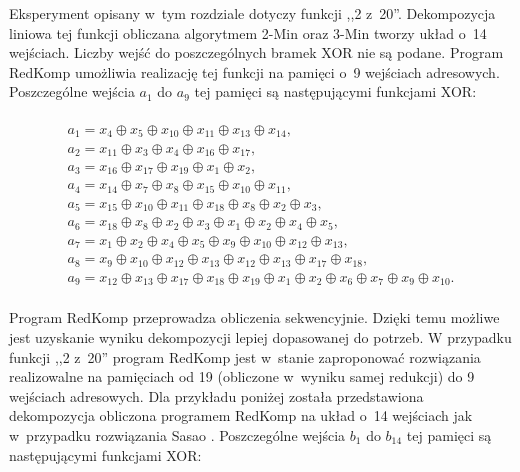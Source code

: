 Eksperyment opisany w~tym rozdziale dotyczy funkcji ,,2 z~20''.
Dekompozycja liniowa tej funkcji obliczana algorytmem 2-Min oraz 3-Min \cite{sasao-s-min} tworzy układ o~14 wejściach.
Liczby wejść do poszczególnych bramek XOR nie są podane.
Program RedKomp umożliwia realizację tej funkcji na pamięci o~9 wejściach adresowych.
Poszczególne wejścia $a_1$ do $a_9$ tej pamięci są następującymi funkcjami XOR:

\begin{multline} \\
a_1 = x_{4} \oplus x_{5} \oplus x_{10} \oplus x_{11} \oplus x_{13} \oplus x_{14}, \\
a_2 = x_{11} \oplus x_{3} \oplus x_{4} \oplus x_{16} \oplus x_{17}, \\
a_3 = x_{16} \oplus x_{17} \oplus x_{19} \oplus x_{1} \oplus x_{2}, \\
a_4 = x_{14} \oplus x_{7} \oplus x_{8} \oplus x_{15} \oplus x_{10} \oplus x_{11}, \\
a_5 = x_{15} \oplus x_{10} \oplus x_{11} \oplus x_{18} \oplus x_{8} \oplus x_{2} \oplus x_{3}, \\
a_6 = x_{18} \oplus x_{8} \oplus x_{2} \oplus x_{3} \oplus x_{1} \oplus x_{2} \oplus x_{4} \oplus x_{5}, \\
a_7 = x_{1} \oplus x_{2} \oplus x_{4} \oplus x_{5} \oplus x_{9} \oplus x_{10} \oplus x_{12} \oplus x_{13}, \\
a_8 = x_{9} \oplus x_{10} \oplus x_{12} \oplus x_{13} \oplus x_{12} \oplus x_{13} \oplus x_{17} \oplus x_{18}, \\
a_9 = x_{12} \oplus x_{13} \oplus x_{17} \oplus x_{18} \oplus x_{19} \oplus x_{1} \oplus x_{2} \oplus x_{6} \oplus x_{7} \oplus x_{9} \oplus x_{10}. \\
\end{multline}

Program RedKomp przeprowadza obliczenia sekwencyjnie.
Dzięki temu możliwe jest uzyskanie wyniku dekompozycji lepiej dopasowanej do potrzeb.
W przypadku funkcji ,,2 z~20''
program RedKomp jest w~stanie zaproponować rozwiązania realizowalne na pamięciach
od 19 (obliczone w~wyniku samej redukcji) do 9 wejściach adresowych.
Dla przykładu poniżej została przedstawiona dekompozycja obliczona programem RedKomp na układ o~14 wejściach jak w~przypadku rozwiązania Sasao \cite{sasao-s-min}.
Poszczególne wejścia $b_1$ do $b_{14}$ tej pamięci są następującymi funkcjami XOR:

